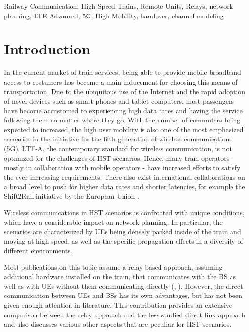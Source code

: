 \documentclass[a4paper,conference,twocolumn,10pt]{IEEEtran}
\begin{document}
\begin{IEEEkeywords}
Railway Communication, High Speed Trains, Remote Units, Relays, network planning, LTE-Advanced, 5G, High Mobility, handover, channel modeling
\end{IEEEkeywords}

\acresetall

\section{Introduction}
\label{Sec:Introduction}
In the current market of train services, being able to provide mobile broadband access to costumers has become a main inducement for choosing this means of transportation. Due to the ubiquitous use of the Internet and the rapid adoption of novel devices such as smart phones and tablet computers, most passengers have become accustomed to experiencing high data rates and having the service following them no matter where they go. With the number of commuters being expected to increased, the high user mobility is also one of the most emphasized scenarios in the initiative for the fifth generation of wireless communications (5G). \ac{LTE-A}, the contemporary standard for wireless communication, is not optimized for the challenges of \ac{HST} scenarios. Hence, many train operators - mostly in collaboration with mobile operators - have increased efforts to satisfy the ever increasing requirements. There also exist international collaborations on a broad level to push for higher data rates and shorter latencies, for example the Shift2Rail initiative by the European Union \cite{shift2rail}.

Wireless communications in \ac{HST} scenarios is confronted with unique conditions, which have a considerable impact on network planning. In particular, the scenarios are characterized by \acp{UE} being densely packed inside of the train and moving at high speed, as well as the specific propagation effects in a diversity of different environments.

Most publications on this topic assume a relay-based approach, assuming additional hardware installed on the train, that communicates with the \ac{BS} as well as with \acp{UE} without them communicating directly (\cite{5872303}, \cite{penetration_values}). However, the direct communication between \acp{UE} and \acp{BS} has its own advantages, but has not been given enough attention in literature. This contribution provides an extensive comparison between the relay approach and the less studied direct link approach and also discusses various other aspects that are peculiar for \ac{HST} scenarios.
\end{document}
